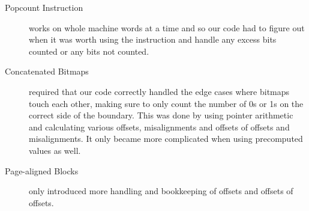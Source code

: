 \begin{description}
\item[Popcount Instruction] works on whole machine words at a time and so our code had to figure out when it was worth using the instruction and handle any excess bits counted or any bits not counted.
\item[Concatenated Bitmaps] required that our code correctly handled the edge cases where bitmaps touch each other, making sure to only count the number of 0s or 1s on the correct side of the boundary.
This was done by using pointer arithmetic and calculating various offsets, misalignments and offsets of offsets and misalignments.
It only became more complicated when using precomputed values as well.
\item[Page-aligned Blocks] only introduced more handling and bookkeeping of offsets and offsets of offsets.
\end{description}
